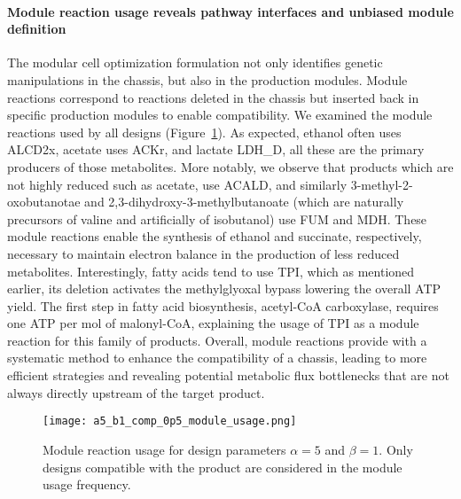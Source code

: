 {\paragraph{Module reaction usage reveals pathway interfaces and unbiased module definition}
The modular cell optimization formulation not only identifies genetic manipulations in the chassis, but also in the production modules.
Module reactions correspond to reactions deleted in the chassis but inserted back in specific production modules to enable compatibility.
We examined the module reactions used by all designs (Figure~\ref{fig7:module-usage}).
As expected, ethanol often uses ALCD2x, acetate uses ACKr, and lactate LDH\_D, all these are the primary producers of those metabolites.
More notably, we observe that products which are not highly reduced such as acetate, use ACALD, and similarly 3-methyl-2-oxobutanotae and 2,3-dihydroxy-3-methylbutanoate (which are naturally precursors of valine and artificially of isobutanol\citep{atsumi2008,atsumi2010}) use FUM and MDH.
These module reactions enable the synthesis of ethanol and succinate, respectively, necessary to maintain electron balance in the production of less reduced metabolites.
Interestingly, fatty acids tend to use TPI, which as mentioned earlier, its deletion activates the methylglyoxal bypass lowering the overall ATP yield.
The first step in fatty acid biosynthesis, acetyl-CoA carboxylase, requires one ATP per mol of malonyl-CoA, explaining the usage of TPI as a module reaction for this family of products.
Overall, module reactions provide with a systematic method to enhance the compatibility of a chassis, leading to more efficient strategies and revealing potential metabolic flux bottlenecks that are not always directly upstream of the target product.


\begin{figure}[h]
    \centering
    \texttt{[image: a5\_b1\_comp\_0p5\_module\_usage.png]}
    \caption[Module reaction usage]{Module reaction usage for design parameters $\alpha=5$ and $\beta=1$. Only designs compatible with the product are considered in the module usage frequency.}%
    \label{fig7:module-usage}
\end{figure}

}
